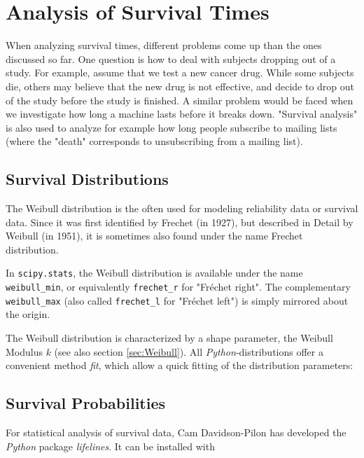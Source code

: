\chapter{Analysis of Survival Times} 

When analyzing survival times, different problems come up than the ones discussed so far. One question is how to deal with subjects dropping out of a study. For example, assume that we test a new cancer drug. While some subjects die, others may believe that the new drug is not effective, and decide to drop out of the study before the study is finished.
A similar problem would be faced when we investigate how long a machine lasts before it breaks down. "Survival analysis"  is also used to analyze for example how long people subscribe to mailing lists (where the "death" corresponds to unsubscribing from a mailing list).

\section{Survival Distributions}

The Weibull distribution is the often used for modeling reliability data or survival data. Since it was first identified by Frechet (in 1927), but described in Detail by Weibull (in 1951), it is sometimes also found under the name Frechet distribution.

In \lstinline{scipy.stats}, the Weibull distribution is available under the name \lstinline{weibull_min}, or equivalently \lstinline{frechet_r} for "Fréchet right".  The complementary \lstinline{weibull_max} (also called \lstinline{frechet_l} for "Fréchet left") is simply mirrored about the origin.

The Weibull distribution is characterized by a shape parameter, the Weibull Modulus $k$ (see also section \ref{sec:Weibull}). All \emph{Python}-distributions offer a convenient method \emph{fit}, which allow a quick fitting of the distribution parameters:



\section{Survival Probabilities}

For statistical analysis of survival data, Cam Davidson-Pilon has developed the \emph{Python} package \emph{lifelines}. It can be installed with

